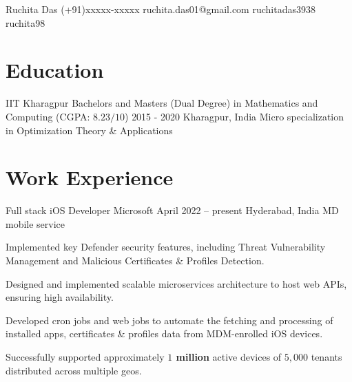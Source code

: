 \documentclass[letterpaper]{resume_config}
\begin{document}
\Header
    {Ruchita Das} %
    {(+91)xxxxx-xxxxx} %
    {ruchita.das01@gmail.com} %
    {ruchitadas3938} %
    {ruchita98} %
\


\section{Education}

\EducationExperience
    {IIT Kharagpur} %
    {Bachelors and Masters (Dual Degree) in Mathematics and Computing (CGPA: $8.23/ 10$)} %
    {2015 - 2020} %
    {Kharagpur, India} %
    {Micro specialization in Optimization Theory \& Applications}

\vspace{-10pt}


\section{Work Experience}

\WorkExperience
    {Full stack iOS Developer} %
    {Microsoft} %
    {April 2022 -- present} %
    {Hyderabad, India} %
    {MD mobile service}
    {
        \item Implemented key Defender security features, including Threat Vulnerability Management and Malicious Certificates \& Profiles Detection. 
    }
    {
        \item Designed and implemented scalable microservices architecture to host web APIs, ensuring high availability.
        \item Developed cron jobs and web jobs to automate the fetching and processing of installed apps, certificates \& profiles data from MDM-enrolled iOS devices.
        \item Successfully supported approximately \textbf{$1$ million } active devices of \textbf{$5,000$} tenants distributed across multiple geos.
    }
\end{document}
